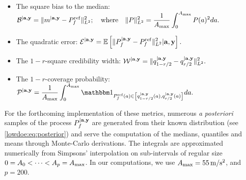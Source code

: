     \begin{itemize}
        \item The square bias to the median: $\displaystyle{\mathcal{B}^{|\mathbf{a},\mathbf{y}} = \|m^{|\mathbf{a},\mathbf{y}}- P_f^{\mathrm{ref}}\|^2_{L^2};\quad \text{where}\quad\|P\|^2_{L^2} = \frac{1}{A_{\max}}\int_{0}^{A_{\max}}P(a)^2 d a.}$
        \item The quadratic error: $\displaystyle{\mathcal{E}^{|\mathbf{a},\mathbf{y}} = \mathbb{E}\left[\|P_f^{|\mathbf{a},\mathbf{y}}-P_f^{\mathrm{ref}} \|^2_{L^2}|\mathbf{a},\mathbf{y}\right].}$
        \item The $1-r$-square credibility width: $\displaystyle{\mathcal{W}^{|\mathbf{a},\mathbf{y}} = \|q_{1-{r/2}}^{|\mathbf{a},\mathbf{y}} - q_{{r/2}}^{|\mathbf{a},\mathbf{y}}\|_{L^2}^2  .}$
        \item The $1-r$-coverage probability: %
        $\displaystyle{\cP^{|\mbf a,\mbf y} = \frac{1}{A_{\max}}\int_0^{A_{\max}}\indic_{P_f^{\mathrm{ref}}(a)\in \left[q_{1-{r/2}}^{|\mbf a,\mbf y}(a), q_{{r/2}}^{|\mbf a,\mbf y}(a) \right] } d a.}$
    \end{itemize}
For the forthcoming implementation of these metrics, numerous \emph{a posteriori} samples of the process $P_f^{|\mathbf{a},\mathbf{y}}$ are generated from their known distribution (see \cref{lowdoe:eq:posterior}) and serve the computation of the medians, quantiles and means through Monte-Carlo derivations. The integrals are approximated numerically from Simpsons' interpolation
{on sub-intervals of regular size  $0=A_0<\dots<A_p=A_{\rm max}$. In our computations, we use  $A_{\rm max}=55\,\mathrm{m/s^2}$, and $p=200$.}



